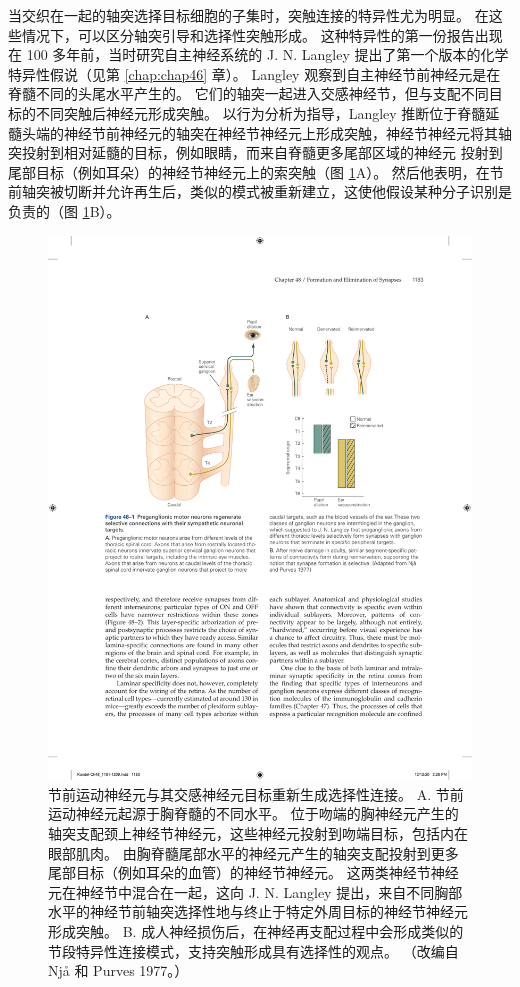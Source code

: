 当交织在一起的轴突选择目标细胞的子集时，突触连接的特异性尤为明显。 在这些情况下，可以区分轴突引导和选择性突触形成。 这种特异性的第一份报告出现在 100 多年前，当时研究自主神经系统的 J. N. Langley 提出了第一个版本的化学特异性假说（见第 \ref{chap:chap46} 章）。 Langley 观察到自主神经节前神经元是在脊髓不同的头尾水平产生的。 它们的轴突一起进入交感神经节，但与支配不同目标的不同突触后神经元形成突触。 
以行为分析为指导，Langley 推断位于脊髓延髓头端的神经节前神经元的轴突在神经节神经元上形成突触，神经节神经元将其轴突投射到相对延髓的目标，例如眼睛，而来自脊髓更多尾部区域的神经元 投射到尾部目标（例如耳朵）的神经节神经元上的索突触（图 \ref{fig:48_1}A）。 
然后他表明，在节前轴突被切断并允许再生后，类似的模式被重新建立，这使他假设某种分子识别是负责的（图 \ref{fig:48_1}B）。

\begin{figure}[htbp]
	\centering
	\includegraphics[width=0.8\linewidth]{chap48/fig_48_1}
	\caption{节前运动神经元与其交感神经元目标重新生成选择性连接。 A. 节前运动神经元起源于胸脊髓的不同水平。 位于吻端的胸神经元产生的轴突支配颈上神经节神经元，这些神经元投射到吻端目标，包括内在眼部肌肉。 由胸脊髓尾部水平的神经元产生的轴突支配投射到更多尾部目标（例如耳朵的血管）的神经节神经元。 这两类神经节神经元在神经节中混合在一起，这向 J. N. Langley 提出，来自不同胸部水平的神经节前轴突选择性地与终止于特定外周目标的神经节神经元形成突触。 B. 成人神经损伤后，在神经再支配过程中会形成类似的节段特异性连接模式，支持突触形成具有选择性的观点。 （改编自 Njå 和 Purves 1977。）}
	\label{fig:48_1}
\end{figure}

